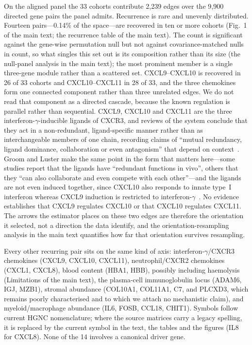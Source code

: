 \documentclass[11pt]{article}
\begin{document}
On the aligned panel the 33 cohorts contribute 2{,}239 edges over the 9{,}900 directed gene pairs the panel admits. Recurrence is rare and unevenly distributed. Fourteen pairs---0.14\% of the space---are recovered in ten or more cohorts (Fig.~1 of the main text; the recurrence table of the main text). The count is significant against the gene-wise permutation null but not against covariance-matched nulls in count, so what singles this set out is its composition rather than its size (the null-panel analysis in the main text); the most prominent member is a single three-gene module rather than a scattered set. CXCL9--CXCL10 is recovered in 26 of 33 cohorts and CXCL10--CXCL11 in 28 of 33, and the three chemokines form one connected component rather than three unrelated edges. We do not read that component as a directed cascade, because the known regulation is parallel rather than sequential. CXCL9, CXCL10 and CXCL11 are the three interferon-$\gamma$-inducible ligands of CXCR3, and reviews of the system conclude that they act in a non-redundant, ligand-specific manner rather than as interchangeable members of one chain, recording claims of ``mutual redundancy, ligand dominance, collaboration or even antagonism'' that depend on context~\citep{metzemaekers2017nonredundant}. Groom and Luster make the same point in the form that matters here---some studies report that the ligands have ``redundant functions in vivo'', others that they ``can also collaborate and even compete with each other''---and the ligands are not even induced together, since CXCL10 also responds to innate type~I interferon whereas CXCL9 induction is restricted to interferon-$\gamma$~\citep{groom2011cxcr3}. No evidence establishes that CXCL9 regulates CXCL10 or that CXCL10 regulates CXCL11. The arrows the estimator places on these two edges are therefore the orientation it selected, not a direction the data identify, and the orientation-resampling analysis in the main text quantifies how far that orientation survives resampling.

Every other recurring pair sits on the same kind of axis: interferon-$\gamma$/CXCR3 chemokines (CXCL9, CXCL10, CXCL11), neutrophil/CXCR2 chemokines (CXCL1, CXCL8), blood content (HBA1, HBB), possibly including haemolysis (Limitations of the main text), the plasma-cell immunoglobulin locus (ADAM6, IGJ, MZB1), stromal abundance (COL10A1, COL11A1, C7, and PLCXD3, which remains poorly characterised and to which we attach no mechanistic claim), and myeloid/macrophage abundance (IL6, FOSB, CCL18, CHIT1). Symbols follow current HGNC nomenclature; where the source matrices carry a legacy spelling, it is replaced by the current symbol in the text, the tables and the figures (IL8 for CXCL8). None of the 14 involves a canonical driver gene.
\end{document}
